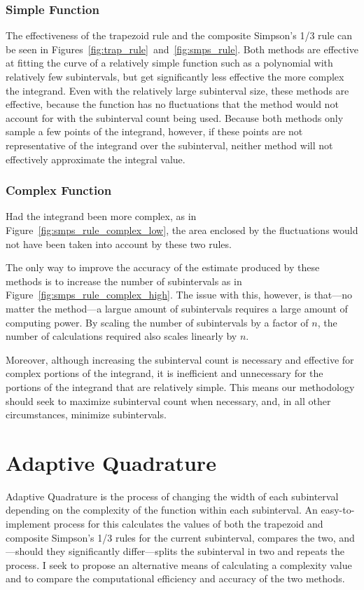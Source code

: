 \documentclass{paper}
\begin{document}
\subsubsection{Simple Function}
The effectiveness of the trapezoid rule and the composite Simpson's 1/3 rule can be seen in Figures~\ref{fig:trap_rule}~and~\ref{fig:smps_rule}.
Both methods are effective at fitting the curve of a relatively simple function such as a polynomial with relatively few subintervals, but get significantly less effective the more complex the integrand.
%
%
%
%
Even with the relatively large subinterval size, these methods are effective, because the function has no fluctuations that the method would not account for with the subinterval count being used.
Because both methods only sample a few points of the integrand, however, if these points are not representative of the integrand over the subinterval, neither method will not effectively approximate the integral value.

\subsubsection{Complex Function}
Had the integrand been more complex, as in Figure~\ref{fig:smps_rule_complex_low}, the area enclosed by the fluctuations would not have been taken into account by these two rules.
%
%

%
The only way to improve the accuracy of the estimate produced by these methods is to increase the number of subintervals as in Figure~\ref{fig:smps_rule_complex_high}.
The issue with this, however, is that---no matter the method---a largue amount of subintervals requires a large amount of computing power.
By scaling the number of subintervals by a factor of \(n\), the number of calculations required also scales linearly by \(n\).
%
%

%
Moreover, although increasing the subinterval count is necessary and effective for complex portions of the integrand, it is inefficient and unnecessary for the portions of the integrand that are relatively simple.
This means our methodology should seek to maximize subinterval count when necessary, and, in all other circumstances, minimize subintervals.

\section{Adaptive Quadrature}
Adaptive Quadrature is the process of changing the width of each subinterval depending on the complexity of the function within each subinterval.
An easy-to-implement process for this calculates the values of both the trapezoid and composite Simpson's 1/3 rules for the current subinterval, compares the two, and---should they significantly differ---splits the subinterval in two and repeats the process. %
I seek to propose an alternative means of calculating a complexity value and to compare the computational efficiency and accuracy of the two methods.
\end{document}
